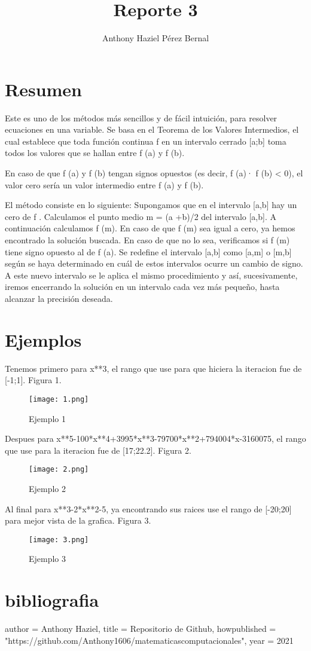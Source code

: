 \documentclass{article}
\title{Reporte 3}
\author{Anthony Haziel Pérez Bernal}
\begin{document}
\section{Resumen}
Este es uno de los métodos más sencillos y de fácil
intuición, para resolver ecuaciones en una variable. Se basa en el Teorema de los Valores Intermedios, el cual establece que toda función continua f en un intervalo cerrado [a;b] toma todos los valores que
se hallan entre f (a) y f (b).

En caso de que f (a) y f (b) tengan signos opuestos (es decir, f (a)· f (b) < 0), el valor cero sería un valor intermedio entre f (a) y f (b).

El método consiste en lo siguiente: Supongamos que en el intervalo [a,b] hay un cero de f . Calculamos el punto medio m = (a +b)/2 del intervalo [a,b]. A continuación calculamos f (m). En caso de que f (m) sea igual a cero, ya hemos encontrado la solución buscada. En caso de que no lo sea, verificamos si f (m) tiene signo opuesto al de f (a). Se redefine el intervalo [a,b] como [a,m] o [m,b] según se haya determinado en cuál de estos intervalos ocurre un cambio de signo. A este nuevo intervalo se le aplica el mismo procedimiento y así, sucesivamente, iremos
encerrando la solución en un intervalo cada vez más pequeño, hasta alcanzar la precisión deseada.

\section{Ejemplos}

Tenemos primero para x**3, el rango que use para que hiciera la iteracion fue de [-1;1]. Figura 1.

\begin{figure}
\centering
    \texttt{[image: 1.png]}
    \caption{Ejemplo 1}
    \label{fig_label}
\end{figure}

Despues para x**5-100*x**4+3995*x**3-79700*x**2+794004*x-3160075, el rango que use para la iteracion fue de [17;22.2]. Figura 2.

\begin{figure}
\centering
    \texttt{[image: 2.png]}
    \caption{Ejemplo 2}
    \label{fig_label}
\end{figure}

Al final para x**3-2*x**2-5, ya encontrando sus raices use el rango de [-20;20] para mejor vista de la grafica. Figura 3.

\begin{figure}
\centering
    \texttt{[image: 3.png]}
    \caption{Ejemplo 3}
    \label{fig_label}
\end{figure}

\section{bibliografia}
author = Anthony Haziel,
  title = Repositorio de Github,
  howpublished = "https://github.com/Anthony1606/matematicascomputacionales",
  year = 2021
\end{document}
